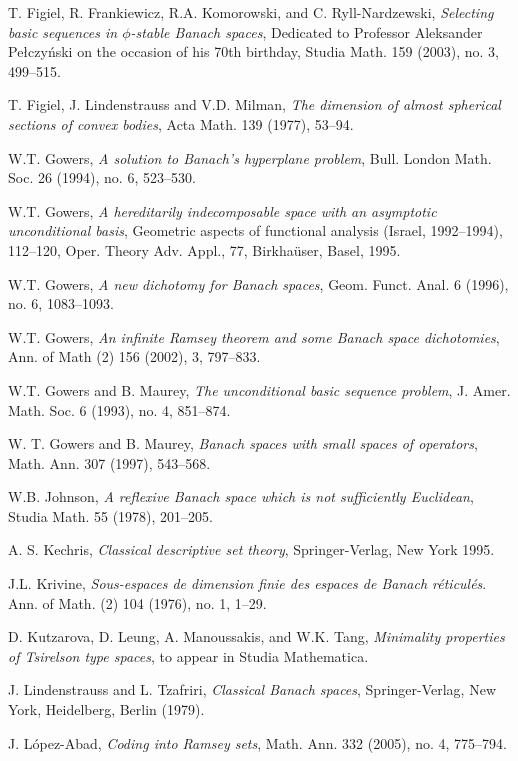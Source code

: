 \documentclass[10pt]{amsart}
\numberwithin{equation}{section}
\begin{document}
\begin{thebibliography}{999}
T. Figiel, R. Frankiewicz, R.A. Komorowski, and C. Ryll-Nardzewski, {\em Selecting basic
sequences in $\phi$-stable Banach spaces},
Dedicated to Professor Aleksander Pe\l czy\'nski on the occasion of his 70th birthday,
Studia Math. 159 (2003), no. 3, 499--515.

 T. Figiel, J. Lindenstrauss and V.D. Milman, {\em The dimension
    of almost spherical sections of convex bodies}, Acta Math. 139 (1977), 53--94.

 W.T. Gowers, {\em A solution to Banach's hyperplane
    problem}, Bull. London Math. Soc.  26  (1994),  no. 6, 523--530.

 W.T. Gowers, {\em A hereditarily indecomposable space with an asymptotic unconditional basis},
Geometric aspects of functional analysis (Israel, 1992--1994),  112--120, Oper. Theory Adv. Appl., 77, Birkha\"user, Basel, 1995.

 W.T. Gowers, {\em A new dichotomy for Banach spaces}, Geom. Funct. Anal.  6  (1996),  no. 6, 1083--1093.

 W.T. Gowers, {\em An infinite Ramsey theorem and some Banach
    space dichotomies}, Ann. of Math (2) 156 (2002), 3, 797--833.

 W.T. Gowers and B. Maurey, {\em The unconditional basic sequence
    problem},  J. Amer. Math. Soc.  6  (1993),  no. 4, 851--874.

 W. T. Gowers and B. Maurey, {\em Banach spaces with small spaces
    of operators}, Math. Ann.  307 (1997), 543--568.

 W.B. Johnson, {\em A reflexive Banach space which is not
    sufficiently Euclidean}, Studia Math. 55 (1978), 201--205.

A. S. Kechris, {\em Classical descriptive set theory}, Springer-Verlag, New York 1995.

 J.L. Krivine, {\em Sous-espaces de dimension finie des espaces de Banach
r\'eticul\'es}. Ann. of Math. (2)  104  (1976), no. 1, 1--29.

 D. Kutzarova, D. Leung, A. Manoussakis, and W.K. Tang, {\em
    Minimality properties of Tsirelson type spaces}, to appear in Studia Mathematica.

 J. Lindenstrauss and L. Tzafriri, {\em Classical Banach
spaces}, Springer-Verlag, New York, Heidelberg, Berlin (1979).

J. L\'opez-Abad, {\em Coding into Ramsey sets}, Math. Ann. 332 (2005), no. 4, 775--794.


\end{thebibliography}
\end{document}
